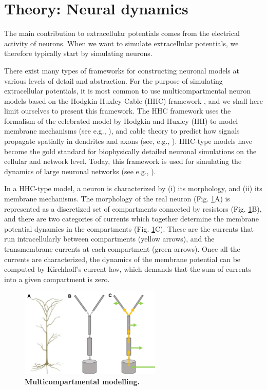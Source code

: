 \section{Theory: Neural dynamics}
\label{sec:Neuron}

The main contribution to extracellular potentials comes from the electrical activity of neurons. When we want to simulate extracellular potentials, we therefore typically start by simulating neurons. 

There exist many types of frameworks for constructing neuronal models at various levels of detail and abstraction. For the purpose of simulating extracellular potentials, it is most common to use multicompartmental neuron models based on the Hodgkin-Huxley-Cable (HHC) framework , and we shall here limit ourselves to present this framework. The HHC framework uses the formalism of the celebrated model by Hodgkin and Huxley (HH) to model membrane mechanisms (see e.g., \cite{Hodgkin1952, KockSegev1998, Pospischil2008}), and cable theory to predict how signals propagate spatially in dendrites and axons (see, e.g., \cite{koch1999, rall2011}). HHC-type models have become the gold standard for biophysically detailed neuronal simulations on the cellular and network level. Today, this framework is used for simulating the dynamics of large neuronal networks (see e.g., \cite{traub2005, markram2015, arkhipov2018}).

In a HHC-type model, a neuron is characterized by (i) its morphology, and (ii) its membrane mechanisms. The morphology of the real neuron (Fig. \ref{Neuron:fig:multicomp}A) is represented as a discretized set of compartments connected by resistors (Fig. \ref{Neuron:fig:multicomp}B), and there are two categories of currents which together determine the membrane potential dynamics in the compartments (Fig. \ref{Neuron:fig:multicomp}C). These are the currents that run intracellularly between compartments (yellow arrows), and the transmembrane currents at each compartment (green arrows). Once all the currents are characterized, the dynamics of the membrane potential can be computed by Kirchhoff's current law, which demands that the sum of currents into a given compartment is zero.

\begin{figure}[!ht]
\begin{center}
\includegraphics[width=0.6\textwidth]{Figures/Neuron/Multicomp.png}
\end{center}
\caption{\textbf{Multicompartmental modelling.} 
}
\label{Neuron:fig:multicomp}
\end{figure}

